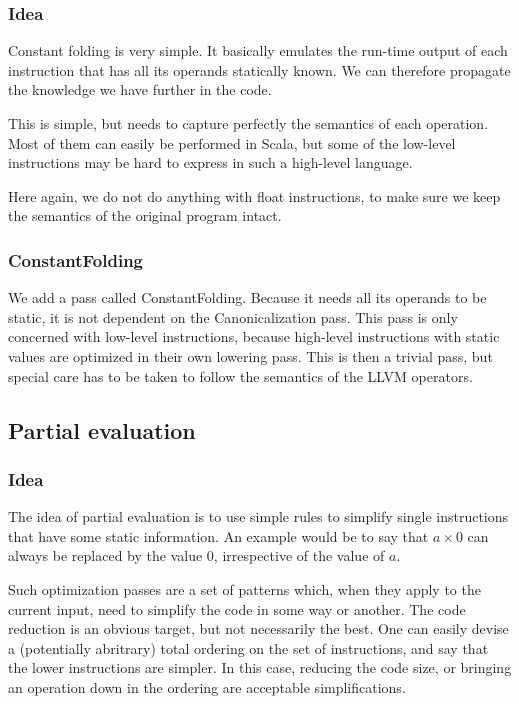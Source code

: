\documentclass[12pt,a4paper]{article}
\newcommand{\scala}[1]{\textsf{#1}}
\begin{document}
\subsubsection*{Idea}

Constant folding is very simple. It basically emulates the run-time output of each instruction that has all its operands statically known. We can therefore propagate the knowledge we have further in the code.

This is simple, but needs to capture perfectly the semantics of each operation. Most of them can easily be performed in Scala, but some of the low-level instructions may be hard to express in such a high-level language.

Here again, we do not do anything with float instructions, to make sure we keep the semantics of the original program intact.

\subsubsection*{ConstantFolding}

We add a pass called \scala{ConstantFolding}. Because it needs all its operands to be static, it is not dependent on the \scala{Canonicalization} pass. This pass is only concerned with low-level instructions, because high-level instructions with static values are optimized in their own lowering pass. This is then a trivial pass, but special care has to be taken to follow the semantics of the LLVM operators.

\subsection{Partial evaluation}

\subsubsection*{Idea}

The idea of partial evaluation is to use simple rules to simplify single instructions that have some static information. An example would be to say that $a \times 0$ can always be replaced by the value $0$, irrespective of the value of $a$.

Such optimization passes are a set of patterns which, when they apply to the current input, need to simplify the code in some way or another. The code reduction is an obvious target, but not necessarily the best. One can easily devise a (potentially abritrary) total ordering on the set of instructions, and say that the lower instructions are simpler. In this case, reducing the code size, or bringing an operation down in the ordering are acceptable simplifications.
\end{document}
